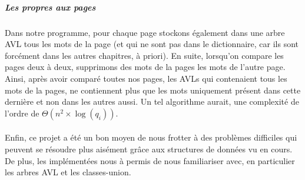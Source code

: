\documentclass[a4paper]{article}
\begin{document}
			\subparagraph{Les propres aux pages}{
			Dans notre programme, pour chaque page stockons également dans une arbre AVL tous
			les mots de la page (et qui ne sont pas dans le dictionnaire, car ils sont forcément
			dans les autres chapitres, à priori). En suite, lorsqu'on compare les pages deux à 
			deux, supprimons des mots de la pages les mots de l'autre page. Ainsi, après avoir 
			comparé toutes nos pages, les AVLs qui contenaient tous les mots de la pages, ne
			contiennent plus que les mots uniquement présent dans cette dernière et non dans les
			autres aussi. Un tel algorithme aurait, une complexité de l'ordre de 
			$\Theta(n^2 \times \log(q_i))$.
			}
		
		\paragraph{}{
		Enfin, ce projet a été un bon moyen de nous frotter à des problèmes difficiles qui peuvent
		se résoudre plus aisément grâce aux structures de données vu en cours. De plus, les 
		implémentées nous à permis de nous familiariser avec, en particulier les arbres AVL et
		les classes-union.
		}
		
\end{document}
